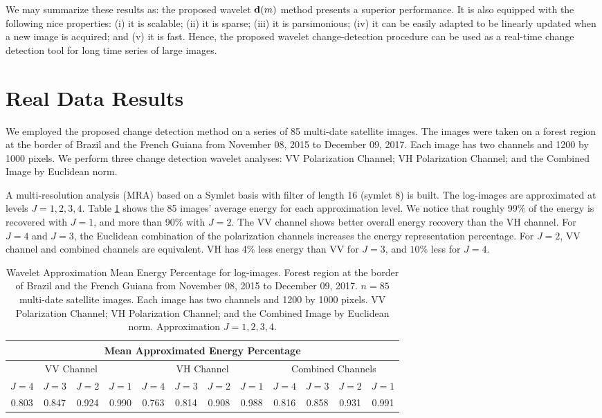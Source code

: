 \documentclass[journal]{IEEEtran}
\newcommand{\vd}{{\textbf d}}
\begin{document}
We may summarize these results as: the proposed wavelet $\vd(m)$ method presents a superior performance. It is also equipped with the following nice properties: (i) it is scalable; (ii) it is sparse; (iii) it is parsimonious; (iv) it can be easily adapted to be linearly updated when a new image is acquired; and (v) it is fast. Hence, the proposed wavelet change-detection procedure can be used as a real-time change detection tool for long time series of large images.    




\section{Real Data Results}\label{section_realdata}

We employed the proposed change detection method on a series of 85 multi-date satellite images. The images were taken on a forest region at the border of Brazil and the French Guiana from November 08, 2015 to December 09, 2017. Each image has two channels and 1200 by 1000 pixels. We perform three change detection wavelet analyses: VV Polarization Channel;  VH Polarization Channel; and the Combined Image by Euclidean norm. 

A multi-resolution analysis (MRA) based on a Symlet basis with filter of length 16 (symlet 8) is built.  The log-images are approximated at levels $J=1,2,3,4$. Table \ref{T:approxenergy} shows the 85 images' average energy for each approximation level. We notice that roughly 99\% of the energy is recovered with $J=1$, and more than  90\% with $J=2$. The VV channel shows better overall energy recovery than the VH channel. For $J=4$ and $J=3$, the Euclidean combination of the polarization channels increases the energy representation percentage.  For $J=2$, VV channel and combined channels are equivalent. VH has 4\% less energy than VV for $J=3$, and $10\%$ less  for $J=4$.

\begin{table}[h!]
\caption{Wavelet Approximation Mean Energy Percentage for log-images. Forest region at the border of Brazil and the French Guiana from November 08, 2015 to December 09, 2017. $n=85$ multi-date satellite images. Each image has two channels and 1200 by 1000 pixels. VV Polarization Channel;  VH Polarization Channel; and the Combined Image by Euclidean norm. Approximation $J=1,2,3,4$.}
\centering
\begin{tabular}{cccc|cccc|cccc}
\hline
\multicolumn{12}{c}{\sc Mean Approximated Energy Percentage}\\
\hline
\multicolumn{4}{c|}{VV Channel}&\multicolumn{4}{c|}{VH Channel}&\multicolumn{4}{c}{Combined Channels}\\
\hline
$J=4$&$J=3$&$J=2$&$J=1$&$J=4$&$J=3$&$J=2$&$J=1$&$J=4$&$J=3$&$J=2$&$J=1$\\
\hline
0.803&0.847&0.924&0.990&0.763&0.814&0.908&0.988&0.816&0.858&0.931&0.991\\
\hline
\end{tabular}\label{T:approxenergy}
\end{table}
\end{document}
